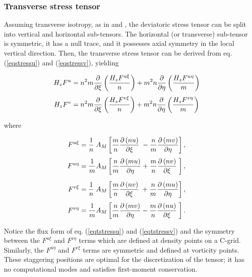 \subsubsection{Transverse stress tensor}

Assuming transverse isotropy, as in
\citet{Sadourny_97} and \citet{Griffies_2000},
the deviatoric stress tensor can be split into vertical and horizontal
sub-tensors.  The horizontal (or transverse) sub-tensor is symmetric, it
has a null trace, and it possesses axial symmetry in the local vertical
direction.  Then, the transverse stress tensor can be derived from eq.
(\ref{eqstressu}) and (\ref{eqstressv}), yielding

\begin{align}
      H_{z}F^{u} &= {n^2}m
{\partial\over\partial\xi}\left(\frac{H_{z}F^{u\xi}}{n}\right) +
                {m^2}n
{\partial\over\partial\eta}\left(\frac{H_{z}F^{u\eta}}{m}\right)
\label{eqtstressu} \\
   \noalign{\smallskip}
      H_{z}F^{v} &= {n^2}m
{\partial\over\partial\xi}\left(\frac{H_{z}F^{v\xi}}{n}\right) +
                {m^2}n
{\partial\over\partial\eta}\left(\frac{H_{z}F^{v\eta}}{m}\right)
\label{eqtstressv} 
\end{align}

where

\begin{align}
         F^{u\xi} &= \frac{1}{n} \;A_{M}\left[
               \frac{m}{n} {\pder{\left( nu \right) }{\xi}} \;-
               \frac{n}{m} {\pder{\left( mv \right) }{\eta}}
\right], \\
      \noalign{\smallskip}
         F^{u\eta} &= \frac{1}{m} A_{M}\left[
               \frac{n}{m} {\pder{\left( mu \right) }{\eta}} +
               \frac{m}{n} {\pder{\left( nv \right) }{\xi}}
\;\right], \\
      \noalign{\medskip}
         F^{v\xi} &= \frac{1}{n} \;A_{M}\left[
               \frac{m}{n} {\pder{\left( nv \right) }{\xi}} \;+
               \frac{n}{m} {\pder{\left( mu \right) }{\eta}}
\right], \\
      \noalign{\smallskip}
         F^{v\eta} &= \frac{1}{m} A_{M}\left[
               \frac{n}{m} {\pder{\left( mv \right) }{\eta}} -
               \frac{m}{n} {\pder{\left( nu \right) }{\xi}}
\;\right].
\end{align}

Notice the flux form of eq. (\ref{eqtstressu}) and (\ref{eqtstressv})
and the symmetry between the $F^{u\xi}$ and $F^{v\eta}$ terms which are
defined at density points on a C-grid. Similarly, the $F^{u\eta}$ and
$F^{v\xi}$ terms are symmetric and defined at vorticity points.  These
staggering positions are optimal for the discretization of the tensor;
it has no computational modes and satisfies first-moment conservation.

